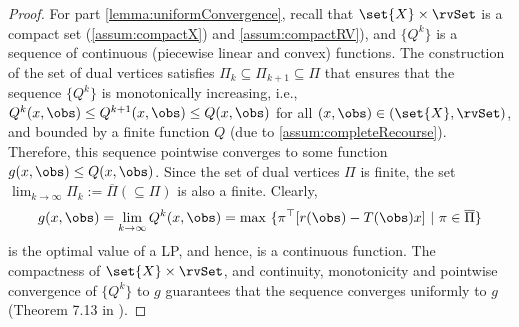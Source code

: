\documentclass[11pt]{article}
\begin{document}
\begin{proof}
For part \ref{lemma:uniformConvergence}, recall that $\set{X} \times \rvSet$ is a compact set (\ref{assum:compactX}) and \ref{assum:compactRV}), and $\{Q^k\}$ is a sequence of continuous (piecewise linear and convex) functions. The construction of the set of dual vertices satisfies $\Pi_k \subseteq \Pi_{k+1} \subseteq \Pi$ that ensures that the sequence $\{Q^k\}$ is monotonically increasing, i.e., $Q^k(x,\obs) \leq Q^{k+1}(x,\obs) \leq Q(x,\obs)$ for all $(x,\obs)\in (\set{X}, \rvSet)$, and bounded by a finite function $Q$ (due to \ref{assum:completeRecourse}). Therefore, this sequence pointwise converges to some function $g(x,\obs) \leq Q(x,\obs)$. Since the set of dual vertices $\Pi$ is finite, the set $\lim_{k\rightarrow\infty}\Pi_k := \overline{\Pi} (\subseteq \Pi)$ is also a finite. Clearly, 
\begin{align*}
    g(x,\obs) = \lim_{k \rightarrow \infty} Q^k(x,\obs) = \max~\{\pi^\top [r(\obs) - T(\obs)x]~|~ \pi \in \overline{\Pi}\}
\end{align*}
is the optimal value of a LP, and hence, is a continuous function. The compactness of $\set{X} \times \rvSet$, and continuity, monotonicity and pointwise convergence of $\{Q^k\}$ to $g$ guarantees that the sequence converges uniformly to $g$ (Theorem 7.13 in \cite{Rudin1976}).


\end{proof}
\end{document}
